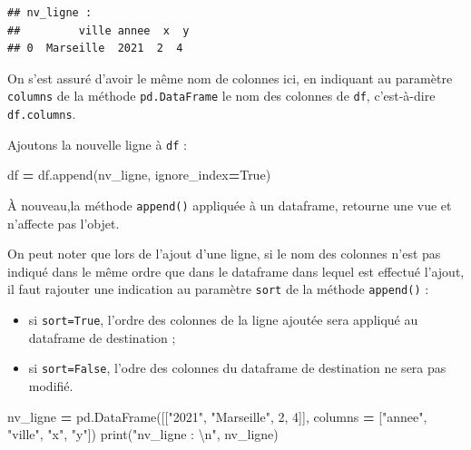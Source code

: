 \documentclass[12pt,]{book}
\newenvironment{Shaded}{\begin{snugshade}}{\end{snugshade}}
\newcommand{\DecValTok}[1]{\textcolor[rgb]{0.00,0.00,0.81}{#1}}
\newcommand{\CharTok}[1]{\textcolor[rgb]{0.31,0.60,0.02}{#1}}
\newcommand{\StringTok}[1]{\textcolor[rgb]{0.31,0.60,0.02}{#1}}
\newcommand{\VariableTok}[1]{\textcolor[rgb]{0.00,0.00,0.00}{#1}}
\newcommand{\OperatorTok}[1]{\textcolor[rgb]{0.81,0.36,0.00}{\textbf{#1}}}
\newcommand{\BuiltInTok}[1]{#1}
\newcommand{\NormalTok}[1]{#1}
\providecommand{\tightlist}{%
  \setlength{\itemsep}{0pt}\setlength{\parskip}{0pt}}
\numberwithin{equation}{section}
\numberwithin{countremarque}{section}
\begin{document}
\begin{lstlisting}
## nv_ligne : 
##         ville annee  x  y
## 0  Marseille  2021  2  4
\end{lstlisting}

On s'est assuré d'avoir le même nom de colonnes ici, en indiquant au
paramètre \texttt{columns} de la méthode \texttt{pd.DataFrame} le nom
des colonnes de \texttt{df}, c'est-à-dire \texttt{df.columns}.

Ajoutons la nouvelle ligne à \texttt{df} :

\begin{Shaded}
\begin{Highlighting}[]
\NormalTok{df }\OperatorTok{=}\NormalTok{ df.append(nv_ligne, ignore_index}\OperatorTok{=}\VariableTok{True}\NormalTok{)}
\end{Highlighting}
\end{Shaded}

À nouveau,la méthode \texttt{append()} appliquée à un dataframe,
retourne une vue et n'affecte pas l'objet.

On peut noter que lors de l'ajout d'une ligne, si le nom des colonnes
n'est pas indiqué dans le même ordre que dans le dataframe dans lequel
est effectué l'ajout, il faut rajouter une indication au paramètre
\texttt{sort} de la méthode \texttt{append()} :

\begin{itemize}
\tightlist
\item
  si \texttt{sort=True}, l'ordre des colonnes de la ligne ajoutée sera
  appliqué au dataframe de destination ;
\item
  si \texttt{sort=False}, l'odre des colonnes du dataframe de
  destination ne sera pas modifié.
\end{itemize}

\begin{Shaded}
\begin{Highlighting}[]
\NormalTok{nv_ligne }\OperatorTok{=}\NormalTok{ pd.DataFrame([[}\StringTok{"2021"}\NormalTok{, }\StringTok{"Marseille"}\NormalTok{, }\DecValTok{2}\NormalTok{, }\DecValTok{4}\NormalTok{]],}
\NormalTok{                       columns }\OperatorTok{=}\NormalTok{ [}\StringTok{"annee"}\NormalTok{, }\StringTok{"ville"}\NormalTok{, }\StringTok{"x"}\NormalTok{, }\StringTok{"y"}\NormalTok{])}
\BuiltInTok{print}\NormalTok{(}\StringTok{"nv_ligne : }\CharTok{\textbackslash{}n}\StringTok{"}\NormalTok{, nv_ligne)}
\end{Highlighting}
\end{Shaded}
\end{document}
